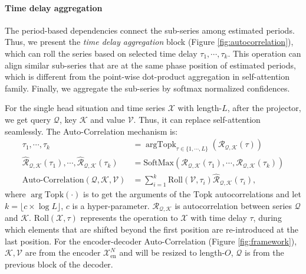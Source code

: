 \paragraph{Time delay aggregation} The period-based dependencies connect the sub-series among estimated periods. Thus, we present the \textit{time delay aggregation} block (Figure \ref{fig:autocorrelation}), which can roll the series based on selected time delay $\tau_{1},\cdots,\tau_{k}$. This operation can align similar sub-series that are at the same phase position of estimated periods, which is different from the point-wise dot-product aggregation in self-attention family. Finally, we aggregate the sub-series by softmax normalized confidences.

For the single head situation and time series $\mathcal{X}$ with length-$L$, after the projector, we get query $\mathcal{Q}$, key $\mathcal{K}$ and value $\mathcal{V}$. Thus, it can replace self-attention seamlessly. The Auto-Correlation mechanism is:
\begin{equation}\label{equ:autocorrelation_fusion}
  \begin{split}
  \tau_{1},\cdots,\tau_{k} & = \mathop{\arg\mathrm{Topk}}_{\tau\in\{1,\cdots,L\}}\left(\mathcal{R}_{\mathcal{Q},\mathcal{K}}(\tau)\right)  \\
  \widehat{\mathcal{R}}_{\mathcal{Q},\mathcal{K}}(\tau_{1}),\cdots,\widehat{\mathcal{R}}_{\mathcal{Q},\mathcal{K}}(\tau_{k}) & = \mathrm{SoftMax}\left(\mathcal{R}_{\mathcal{Q},\mathcal{K}}(\tau_{1}),\cdots,\mathcal{R}_{\mathcal{Q},\mathcal{K}}(\tau_{k})\right) \\
  \mathrm{Auto\text{-}Correlation}(\mathcal{Q},\mathcal{K},\mathcal{V})&= \sum_{i=1}^{k}\mathrm{Roll}(\mathcal{V},\tau_{i})\widehat{\mathcal{R}}_{\mathcal{Q},\mathcal{K}}(\tau_{i}),
  \end{split}
\end{equation}
where $\arg\mathrm{Topk}(\cdot)$ is to get the arguments of the $\mathrm{Topk}$ autocorrelations and let $k=\lfloor c\times\log L\rfloor$, $c$ is a hyper-parameter. $\mathcal{R}_{\mathcal{Q},\mathcal{K}}$ is autocorrelation between series $\mathcal{Q}$ and $\mathcal{K}$. $\mathrm{Roll}(\mathcal{X},\tau)$ represents the operation to $\mathcal{X}$ with time delay $\tau$, during which elements that are shifted beyond the first position are re-introduced at the last position. For the encoder-decoder Auto-Correlation (Figure \ref{fig:framework}), $\mathcal{K}, \mathcal{V}$ are from the encoder $\mathcal{X}_{\mathrm{en}}^{N}$ and will be resized to length-$O$, $\mathcal{Q}$ is from the previous block of the decoder.

